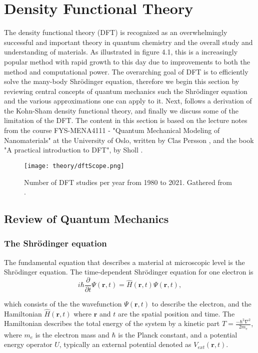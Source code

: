 \chapter{Density Functional Theory}
\label{sec:DFT}

The density functional theory (DFT) is recognized as an overwhelmingly successful and important theory in quantum chemistry and the overall study and understanding of materials. As illustrated in figure 4.1, this is a increasingly popular method with rapid growth to this day due to improvements to both the method and computational power. The overarching goal of DFT is to efficiently solve the many-body Shr\"{o}dinger equation, therefore we begin this section by reviewing central concepts of quantum mechanics such the Shr\"{o}dinger equation and the various approximations one can apply to it. Next, follows a derivation of the Kohn-Sham density functional theory, and finally we discuss some of the limitation of the DFT. The content in this section is based on the lecture notes from the course FYS-MENA4111 - "Quantum Mechanical Modeling of Nanomaterials" at the University of Oslo, written by Clas Persson \cite{persson2020}, and the book "A practical introduction to DFT", by Sholl \cite{Sholl2009}. 

\begin{figure}[H]
\centering
\texttt{[image: theory/dftScope.png]}
\caption{Number of DFT studies per year from 1980 to 2021. Gathered from \cite{dimensions}.}
\end{figure}

\section{Review of Quantum Mechanics}

\subsection{The Shr\"{o}dinger equation}
The fundamental equation that describes a material at microscopic level is the Shr\"{o}dinger equation. The time-dependent Shr\"{o}dinger equation for one electron is
\begin{equation}
    i\hbar\frac{\partial}{\partial t}\Psi(\boldsymbol{r}, t) = \hat{H}(\boldsymbol{r},t)\Psi(\boldsymbol{r}, t),
\end{equation}

which consists of the the wavefunction $\Psi(\boldsymbol{r},t)$ to describe the electron, and the Hamiltonian $\hat{H}(\boldsymbol{r},t)$ where $\boldsymbol{r}$ and $t$ are the spatial position and time. The Hamiltonian describes the total energy of the system by a kinetic part $T = \frac{-\hbar^2\nabla^2}{2m_e}$, where $m_e$ is the electron mass and $\hbar$ is the Planck constant, and a potential energy operator $U$, typically an external potential denoted as $V_{ext}(\boldsymbol{r}, t)$. 

